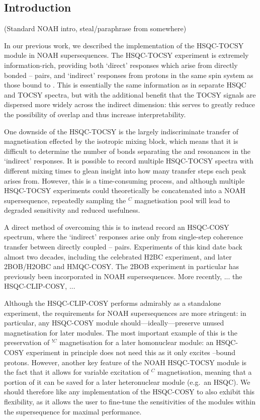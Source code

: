\documentclass[a4paper,12pt]{article}
\newcommand{\proton}{\ch{^{1}H}}
\newcommand{\carbon}{\ch{^{13}C}}
\newcommand{\CH}{\carbon{}--\proton{}}
\newcommand{\HH}{\proton{}--\proton{}}
\newcommand{\magn}[1]{\ch{^1H}$^{#1}$}
\newcommand{\magnnot}[1]{\ch{^1H}$^{!#1}$}
\newcommand{\todo}[1]{{\color{OrangeRed}#1}}
\begin{document}
\begin{refsection}
\clearpage

\section{Introduction}

\todo{(Standard NOAH intro, steal/paraphrase from somewhere)}

In our previous work\autocite{Yong2021JMR}, we described the implementation of the HSQC-TOCSY module in NOAH supersequences.
The HSQC-TOCSY experiment is extremely information-rich, providing both `direct' responses which arise from directly bonded \CH{} pairs, and `indirect' responses from protons in the same spin system as those bound to \carbon{}.
This is essentially the same information as in separate HSQC and TOCSY spectra, but with the additional benefit that the TOCSY signals are dispersed more widely across the \carbon{} indirect dimension: this serves to greatly reduce the possibility of overlap and thus increase interpretability.

One downside of the HSQC-TOCSY is the largely indiscriminate transfer of magnetisation effected by the isotropic mixing block, which means that it is difficult to determine the number of bonds separating the \carbon{} and \proton{} resonances in the `indirect' responses.
It is possible to record multiple HSQC-TOCSY spectra with different mixing times to glean insight into how many transfer steps each peak arises from.
However, this is a time-consuming process, and although multiple HSQC-TOCSY experiments could theoretically be concatenated into a NOAH supersequence, repeatedly sampling the \magn{C} magnetisation pool will lead to degraded sensitivity and reduced usefulness.

A direct method of overcoming this is to instead record an HSQC-COSY spectrum, where the `indirect' responses arise only from single-step coherence transfer between directly coupled \HH{} pairs.
Experiments of this kind date back almost two decades, including the celebrated H2BC experiment\autocite{Nyberg2005JACS,Nyberg2005MRC}, and later 2BOB/H2OBC\autocite{Kupce2017MRC} and HMQC-COSY\autocite{Hu2011JBNMR}.
The 2BOB experiment in particular has previously been incorporated in NOAH supersequences\autocite{Kupce2019JMR}.
\todo{More recently, ... the HSQC-CLIP-COSY, ...}

Although the HSQC-CLIP-COSY performs admirably as a standalone experiment, the requirements for NOAH supersequences are more stringent: in particular, any HSQC-COSY module should---ideally---preserve unused magnetisation for later modules.
The most important example of this is the preservation of \magnnot{C} magnetisation for a later homonuclear module: an HSQC-COSY experiment in principle does not need this as it only excites \carbon{}--bound protons.
However, another key feature of the NOAH HSQC-TOCSY module is the fact that it allows for variable excitation of \magn{C} magnetisation, meaning that a portion of it can be saved for a later heteronuclear module (e.g.\ an HSQC).
We should therefore like any implementation of the HSQC-COSY to also exhibit this flexibility, as it allows the user to fine-tune the sensitivities of the modules within the supersequence for maximal performance.



\end{refsection}
\end{document}
